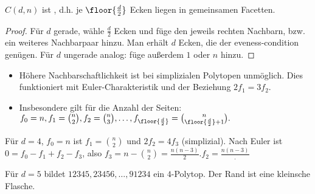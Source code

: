 \begin{kor}
    $C(d,n)$ ist , d.h. je $\floor{\frac{d}{2}}$ Ecken liegen in gemeinsamen Facetten.
    \begin{proof}
        Für $d$ gerade, wähle $\frac{d}{2}$ Ecken und füge den jeweils rechten Nachbarn, bzw. ein weiteres Nachbarpaar hinzu.
        Man erhält $d$ Ecken, die der eveness-condition genügen.
        Für $d$ ungerade analog: füge außerdem $1$ oder $n$ hinzu.
    \end{proof}
    \begin{note}
        \begin{itemize}
            \item
                Höhere Nachbarschaftlichkeit ist bei simplizialen Polytopen unmöglich.
                Dies funktioniert mit Euler-Charakteristik und der Beziehung $2f_1 = 3f_2$.
            \item
                Insbesondere gilt für die Anzahl der Seiten:
                \begin{math}
                    f_0 = n,
                    f_1 = \binom{n}{2},
                    f_2 = \binom{n}{3},
                    \dotsc, 
                    f_{\floor{\frac{d}{2}}} = \binom{n}{\floor{\frac{d}{2}} + 1}.
                \end{math}
        \end{itemize}
    \end{note}
\end{kor}

\begin{ex}
    Für $d = 4$, $f_0 = n$ ist $f_1 = \binom{n}{2}$ und $2 f_2 = 4f_3$ (simplizial).
    Nach Euler ist $0 = f_0 - f_1 + f_2 - f_3$, also
    \begin{math}
        f_3 = n - \binom{n}{2} = \frac{n(n-3)}{2}.
        f_2 = \frac{n(n-3)}.
    \end{math}
\end{ex}

\begin{ex}
    Für $d = 5$ bildet
    \begin{math}
        12345, 23456, \dotsc, 91234
    \end{math}
    ein $4$-Polytop.
    Der Rand ist eine kleinsche Flasche.
\end{ex}



